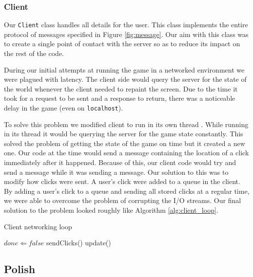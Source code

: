 \subsubsection{Client}

Our \texttt{Client} class handles all details for the user. This class
implements the entire protocol of messages specified in Figure
\ref{fig:message}. Our aim with this class was to create a single
point of contact with the server so as to reduce its impact on the
rest of the code.

During our initial attempts at running the game in a networked
environment we were plagued with latency. The client side would query
the server for the state of the world whenever the client needed to
repaint the screen. Due to the time it took for a request to be sent
and a response to return, there was a noticeable delay in the game
(even on \texttt{localhost}).

To solve this problem we modified client to run in its own thread
\cite{horst2008:2}. While running in its thread it would be querying
the server for the game state constantly. This solved the problem of
getting the state of the game on time but it created a new one. Our
code at the time would send a message containing the location of a
click immediately after it happened. Because of this, our client code
would try and send a message while it was sending a message. Our
solution to this was to modify how clicks were sent. A user's click
were added to a queue in the client. By adding a user's click to a
queue and sending all stored clicks at a regular time, we were able to
overcome the problem of corrupting the I/O streams. Our final solution
to the problem looked roughly like Algorithm \ref{alg:client_loop}.

\begin{algorithm}                      
\caption{Client networking loop}       
\label{alg:client_loop}                
\begin{algorithmic}                    
\STATE $done \Leftarrow  false$
\STATE{}
\STATE sendClicks() 
\STATE{}
\STATE update()     
\ENDWHILE
\end{algorithmic}
\end{algorithm}


\subsection{Polish}

